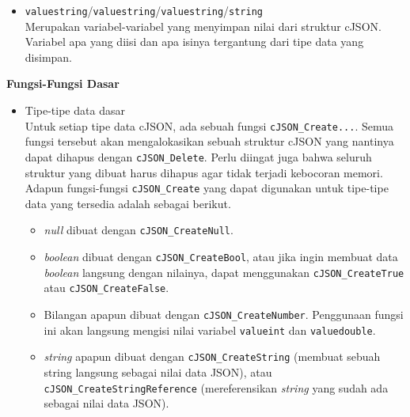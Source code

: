 \documentclass[a4paper,twoside]{article}
\begin{document}
\begin{enumerate}
\begin{itemize}
	\item \verb|valuestring|/\verb|valuestring|/\verb|valuestring|/\verb|string|\\	
	Merupakan variabel-variabel yang menyimpan nilai dari struktur cJSON. Variabel apa yang diisi dan apa isinya tergantung dari tipe data yang disimpan.
\end{itemize}

\textbf{Fungsi-Fungsi Dasar}

\begin{itemize}
	\item Tipe-tipe data dasar\\
	Untuk setiap tipe data cJSON, ada sebuah fungsi \verb|cJSON_Create...|. Semua fungsi tersebut akan mengalokasikan sebuah struktur cJSON yang nantinya dapat dihapus dengan \verb|cJSON_Delete|. Perlu diingat juga bahwa seluruh struktur yang dibuat harus dihapus agar tidak terjadi kebocoran memori. Adapun fungsi-fungsi \verb|cJSON_Create| yang dapat digunakan untuk tipe-tipe data yang tersedia adalah sebagai berikut.
	
	\begin{itemize}
		\item \textit{null} dibuat dengan \verb|cJSON_CreateNull|.
		\item \textit{boolean} dibuat dengan \verb|cJSON_CreateBool|, atau jika ingin membuat data \textit{boolean} langsung dengan nilainya, dapat menggunakan \verb|cJSON_CreateTrue| atau \verb|cJSON_CreateFalse|.
		\item Bilangan apapun dibuat dengan \verb|cJSON_CreateNumber|. Penggunaan fungsi ini akan langsung mengisi nilai variabel \verb|valueint| dan \verb|valuedouble|.
		\item \textit{string} apapun dibuat dengan \verb|cJSON_CreateString| (membuat sebuah string langsung sebagai nilai data JSON), atau \verb|cJSON_CreateStringReference| (mereferensikan \textit{string} yang sudah ada sebagai nilai data JSON).
	\end{itemize}
	

\end{itemize}
\end{enumerate}
\end{document}
